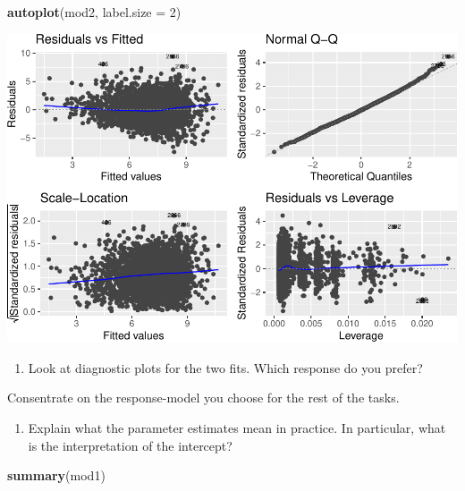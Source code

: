 \documentclass[
]{article}
\newenvironment{Shaded}{\begin{snugshade}}{\end{snugshade}}
\newcommand{\AttributeTok}[1]{\textcolor[rgb]{0.13,0.29,0.53}{#1}}
\newcommand{\DecValTok}[1]{\textcolor[rgb]{0.00,0.00,0.81}{#1}}
\newcommand{\FunctionTok}[1]{\textcolor[rgb]{0.13,0.29,0.53}{\textbf{#1}}}
\newcommand{\NormalTok}[1]{#1}
\providecommand{\tightlist}{%
  \setlength{\itemsep}{0pt}\setlength{\parskip}{0pt}}
\begin{document}
\begin{Shaded}
\begin{Highlighting}[]
\FunctionTok{autoplot}\NormalTok{(mod2, }\AttributeTok{label.size =} \DecValTok{2}\NormalTok{)}
\end{Highlighting}
\end{Shaded}

\includegraphics{2MLR_files/figure-latex/unnamed-chunk-26-2.pdf}

\begin{enumerate}
\def\labelenumi{\arabic{enumi}.}
\tightlist
\item
  Look at diagnostic plots for the two fits. Which response do you
  prefer?
\end{enumerate}

Consentrate on the response-model you choose for the rest of the tasks.

\begin{enumerate}
\def\labelenumi{\arabic{enumi}.}
\setcounter{enumi}{1}
\tightlist
\item
  Explain what the parameter estimates mean in practice. In particular,
  what is the interpretation of the intercept?
\end{enumerate}

\begin{Shaded}
\begin{Highlighting}[]
\FunctionTok{summary}\NormalTok{(mod1)}
\end{Highlighting}
\end{Shaded}
\end{document}
